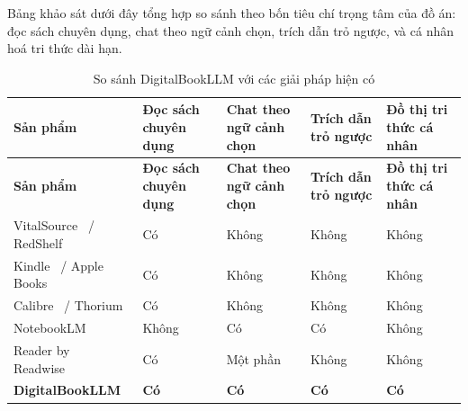 Bảng khảo sát dưới đây tổng hợp so sánh theo bốn tiêu chí trọng tâm của đồ án: đọc sách chuyên dụng, chat theo ngữ cảnh chọn, trích dẫn trỏ ngược, và cá nhân hoá tri thức dài hạn.

\begin{longtable}{|L{0.24\textwidth}|C{0.14\textwidth}|C{0.16\textwidth}|C{0.14\textwidth}|C{0.18\textwidth}|}
\caption{So sánh DigitalBookLLM với các giải pháp hiện có}\label{tab:competitors}\\
\hline
\textbf{Sản phẩm} & \textbf{Đọc sách chuyên dụng} & \textbf{Chat theo ngữ cảnh chọn} & \textbf{Trích dẫn trỏ ngược} & \textbf{Đồ thị tri thức cá nhân} \\
\hline
\endfirsthead
\hline
\textbf{Sản phẩm} & \textbf{Đọc sách chuyên dụng} & \textbf{Chat theo ngữ cảnh chọn} & \textbf{Trích dẫn trỏ ngược} & \textbf{Đồ thị tri thức cá nhân} \\
\hline
\endhead
VitalSource~\cite{vitalsourceBookshelf} / RedShelf~\cite{redshelfEreader} & Có & Không & Không & Không \\\hline
Kindle~\cite{amazonKindle} / Apple Books~\cite{appleBooks} & Có & Không & Không & Không \\\hline
Calibre~\cite{calibreEbook} / Thorium~\cite{thoriumReader} & Có & Không & Không & Không \\\hline
NotebookLM~\cite{googleNotebookLM} & Không & Có & Có & Không \\\hline
Reader by Readwise~\cite{readwiseReader} & Có & Một phần & Không & Không \\\hline
\textbf{DigitalBookLLM} & \textbf{Có} & \textbf{Có} & \textbf{Có} & \textbf{Có} \\\hline
\end{longtable}
